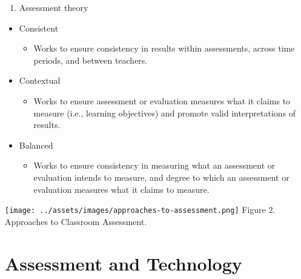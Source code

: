 \documentclass[
]{book}
\providecommand{\tightlist}{%
  \setlength{\itemsep}{0pt}\setlength{\parskip}{0pt}}
\begin{document}
\begin{enumerate}
\def\labelenumi{\arabic{enumi}.}
\setcounter{enumi}{3}
\tightlist
\item
  Assessment theory\\
\end{enumerate}

\begin{itemize}
\tightlist
\item
  Consistent

  \begin{itemize}
  \tightlist
  \item
    Works to ensure consistency in results within assessments, across time periods, and between teachers.\\
  \end{itemize}
\item
  Contextual

  \begin{itemize}
  \tightlist
  \item
    Works to ensure assessment or evaluation measures what it claims to measure (i.e., learning objectives) and promote valid interpretations of results.\\
  \end{itemize}
\item
  Balanced

  \begin{itemize}
  \tightlist
  \item
    Works to ensure consistency in measuring what an assessment or evaluation intends to measure, and degree to which an assessment or evaluation measures what it claims to measure.
  \end{itemize}
\end{itemize}

\texttt{[image: ../assets/images/approaches-to-assessment.png]}
Figure 2. Approaches to Classroom Assessment. \citep[p.~10]{delucaExploringAssessmentCultures2021}

\hypertarget{assessment-and-technology}{%
\section{Assessment and Technology}\label{assessment-and-technology}}
\end{document}
